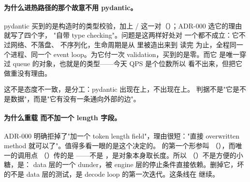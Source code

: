 \paragraph{为什么进热路径的那个故意不用 pydantic。}
pydantic 买到的是构造时的类型校验，加上  / 
这一对（）；ADR-000 选它的理由就写了四个字，
"自带 type checking"。问题是这两样好处对  一个都不成立：它不过网络、不落盘、
不序列化，生命周期是从  里被造出来到  读完
 为止，全程同一个进程、同一个 event loop。为它付一次 validation，买到的是零。而它
是唯一穿过 queue 的对象，也就是的类型——今天 QPS 是个位数所以
看不出来，但把它做重没有理由。

这不是态度不一致，是分工：pydantic 出现在上，不出现在上。
判据不是"它是不是数据"，而是"它有没有一条通向外部的边"。

\paragraph{为什么重载  而不加一个 length 字段。}
ADR-000 明确拒掉了"加一个 token length field"，理由很短："直接 overwritten 
method 就可以了"。值得多看一眼的是这个决定的。
 的第一个形参叫 
（），而唯一的调用点
（）传的是 ——不是
，是对象本身取长度。所以 
（）不是方便的小糖，是：
data 层的一个 dunder，被 engine 层的停止条件直接依赖。删掉它，坏的不是 data 层的测试，是 decode
loop 的第一次迭代。这条线在  继续。

